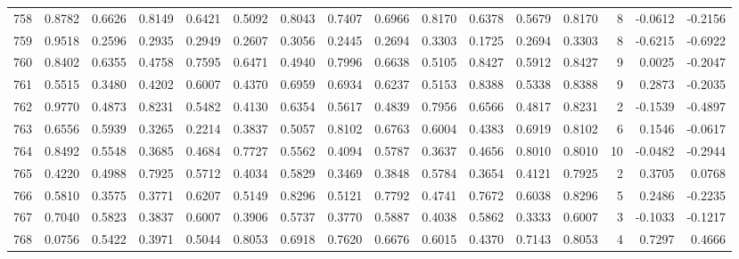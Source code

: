 \begin{tabular}{lrrrrrrrrrrrrrrr}
758 &      0.8782 &  0.6626 &  0.8149 &  0.6421 &  0.5092 &  0.8043 &  0.7407 &  0.6966 &  0.8170 &  0.6378 &   0.5679 &     0.8170 &      8 &                   -0.0612 &                    -0.2156 \\
759 &      0.9518 &  0.2596 &  0.2935 &  0.2949 &  0.2607 &  0.3056 &  0.2445 &  0.2694 &  0.3303 &  0.1725 &   0.2694 &     0.3303 &      8 &                   -0.6215 &                    -0.6922 \\
760 &      0.8402 &  0.6355 &  0.4758 &  0.7595 &  0.6471 &  0.4940 &  0.7996 &  0.6638 &  0.5105 &  0.8427 &   0.5912 &     0.8427 &      9 &                    0.0025 &                    -0.2047 \\
761 &      0.5515 &  0.3480 &  0.4202 &  0.6007 &  0.4370 &  0.6959 &  0.6934 &  0.6237 &  0.5153 &  0.8388 &   0.5338 &     0.8388 &      9 &                    0.2873 &                    -0.2035 \\
762 &      0.9770 &  0.4873 &  0.8231 &  0.5482 &  0.4130 &  0.6354 &  0.5617 &  0.4839 &  0.7956 &  0.6566 &   0.4817 &     0.8231 &      2 &                   -0.1539 &                    -0.4897 \\
763 &      0.6556 &  0.5939 &  0.3265 &  0.2214 &  0.3837 &  0.5057 &  0.8102 &  0.6763 &  0.6004 &  0.4383 &   0.6919 &     0.8102 &      6 &                    0.1546 &                    -0.0617 \\
764 &      0.8492 &  0.5548 &  0.3685 &  0.4684 &  0.7727 &  0.5562 &  0.4094 &  0.5787 &  0.3637 &  0.4656 &   0.8010 &     0.8010 &     10 &                   -0.0482 &                    -0.2944 \\
765 &      0.4220 &  0.4988 &  0.7925 &  0.5712 &  0.4034 &  0.5829 &  0.3469 &  0.3848 &  0.5784 &  0.3654 &   0.4121 &     0.7925 &      2 &                    0.3705 &                     0.0768 \\
766 &      0.5810 &  0.3575 &  0.3771 &  0.6207 &  0.5149 &  0.8296 &  0.5121 &  0.7792 &  0.4741 &  0.7672 &   0.6038 &     0.8296 &      5 &                    0.2486 &                    -0.2235 \\
767 &      0.7040 &  0.5823 &  0.3837 &  0.6007 &  0.3906 &  0.5737 &  0.3770 &  0.5887 &  0.4038 &  0.5862 &   0.3333 &     0.6007 &      3 &                   -0.1033 &                    -0.1217 \\
768 &      0.0756 &  0.5422 &  0.3971 &  0.5044 &  0.8053 &  0.6918 &  0.7620 &  0.6676 &  0.6015 &  0.4370 &   0.7143 &     0.8053 &      4 &                    0.7297 &                     0.4666 \\

\end{tabular}

